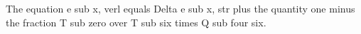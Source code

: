 The equation e sub x, verl equals Delta e sub x, str plus the quantity one minus the fraction T sub zero over T sub six times Q sub four six.